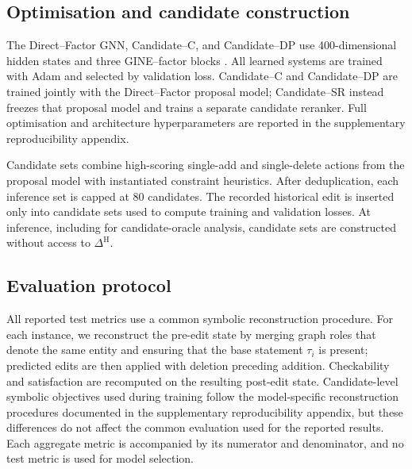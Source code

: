 \documentclass[a4paper,UKenglish,cleveref,autoref,thm-restate]{tgdk-v2021}
\newcommand{\histedit}{\Delta^{\mathrm{H}}}
\begin{document}
\subsection{Optimisation and candidate construction}
\label{subsec:training-protocol}

The Direct--Factor GNN, Candidate--C, and Candidate--DP use 400-dimensional hidden states and three GINE--factor blocks%
. All learned systems are trained with Adam and selected by validation loss. Candidate--C and Candidate--DP are trained jointly with the Direct--Factor proposal model; Candidate--SR instead freezes that proposal model and trains a separate candidate reranker. Full optimisation and architecture hyperparameters are reported in the supplementary reproducibility appendix.

Candidate sets combine high-scoring single-add and single-delete actions from the proposal model with instantiated constraint heuristics. After deduplication, each inference set is capped at 80 candidates. The recorded historical edit is inserted only into candidate sets used to compute training and validation losses. At inference, including for candidate-oracle analysis, candidate sets are constructed without access to \(\histedit\).

\subsection{Evaluation protocol}
\label{subsec:evaluation-protocol}

All reported test metrics use a common symbolic reconstruction procedure. For each instance, we reconstruct the pre-edit state by merging graph roles that denote the same entity and ensuring that the base statement \(\tau_i\) is present; predicted edits are then applied with deletion preceding addition. Checkability and satisfaction are recomputed on the resulting post-edit state. Candidate-level symbolic objectives used during training follow the model-specific reconstruction procedures documented in the supplementary reproducibility appendix, but these differences do not affect the common evaluation used for the reported results. Each aggregate metric is accompanied by its numerator and denominator, and no test metric is used for model selection.
\end{document}
